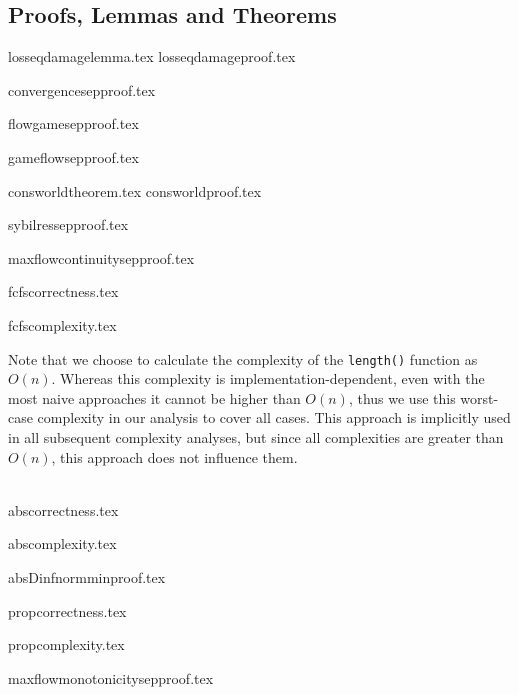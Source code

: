 \subsection{Proofs, Lemmas and Theorems}
{losseqdamagelemma.tex}
{losseqdamageproof.tex}

{convergencesepproof.tex}

{flowgamesepproof.tex}

{gameflowsepproof.tex}

{consworldtheorem.tex}
{consworldproof.tex}

{sybilressepproof.tex}

{maxflowcontinuitysepproof.tex}

{fcfscorrectness.tex}

{fcfscomplexity.tex}

Note that we choose to calculate the complexity of the \texttt{length()} function as $O\left(n\right)$. Whereas this
complexity is implementation-dependent, even with the most naive approaches it cannot be higher than $O\left(n\right)$,
thus we use this worst-case complexity in our analysis to cover all cases. This approach is implicitly used in all
subsequent complexity analyses, but since all complexities are greater than $O\left(n\right)$, this approach does not
influence them.

\ \\

{abscorrectness.tex}

{abscomplexity.tex}

{absDinfnormminproof.tex}

{propcorrectness.tex}

{propcomplexity.tex}

{maxflowmonotonicitysepproof.tex}
